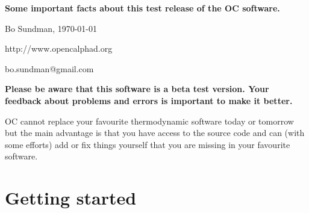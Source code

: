 \documentclass[12pt]{article}
\begin{document}
\begin{center}
{\Large \bf Some important facts about this test release of the
OC software.}

Bo Sundman, \today

http://www.opencalphad.org

bo.sundman@gmail.com
\end{center}

{\large \bf Please be aware that this software is a beta test version.
Your feedback about problems and errors is important to make it
better.}

OC cannot replace your favourite thermodynamic software today or
tomorrow but the main advantage is that you have access to the source
code and can (with some efforts) add or fix things yourself that you
are missing in your favourite software.

\section{Getting started}
\end{document}
